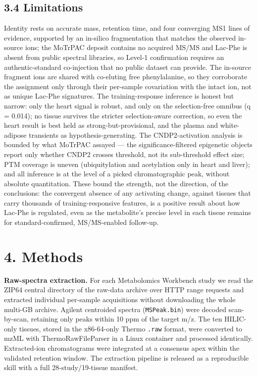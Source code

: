 \documentclass[11pt]{article}
\begin{document}
\subsection*{3.4 Limitations}

Identity rests on accurate mass, retention time, and four converging MS1 lines of evidence,
supported by an in-silico fragmentation that matches the observed in-source ions; the
MoTrPAC deposit contains no acquired MS/MS and Lac-Phe is absent from public spectral
libraries, so Level-1 confirmation requires an authentic-standard co-injection that no public
dataset can provide. The in-source fragment ions are shared with co-eluting free
phenylalanine, so they corroborate the assignment only through their per-sample covariation
with the intact ion, not as unique Lac-Phe signatures. The training-response inference is
honest but narrow: only the heart signal is robust, and only on the selection-free omnibus
(q = 0.014); no tissue survives the stricter selection-aware correction, so even the heart
result is best held as strong-but-provisional, and the plasma and white-adipose transients as
hypothesis-generating. The CNDP2-activation analysis is bounded by what MoTrPAC assayed --- the
significance-filtered epigenetic objects report only whether CNDP2 crosses threshold, not its
sub-threshold effect size; PTM coverage is uneven (ubiquitylation and acetylation only in
heart and liver); and all inference is at the level of a picked chromatographic peak, without
absolute quantitation. These bound the strength, not the direction, of the conclusions: the
convergent absence of any activating change, against tissues that carry thousands of
training-responsive features, is a positive result about how Lac-Phe is regulated, even as
the metabolite's precise level in each tissue remains for standard-confirmed, MS/MS-enabled
follow-up.

\section*{4. Methods}

\textbf{Raw-spectra extraction.} For each Metabolomics Workbench study we read the ZIP64
central directory of the raw-data archive over HTTP range requests and extracted
individual per-sample acquisitions without downloading the whole multi-GB archive.
Agilent centroided spectra (\texttt{MSPeak.bin}) were decoded scan-by-scan, retaining only
peaks within 10 ppm of the target m/z. The ten HILIC-only tissues, stored in the
x86-64-only Thermo \texttt{.raw} format, were converted to mzML with ThermoRawFileParser in a
Linux container and processed identically. Extracted-ion chromatograms were integrated
at a consensus apex within the validated retention window. The extraction pipeline is
released as a reproducible skill with a full 28-study/19-tissue manifest.
\end{document}
